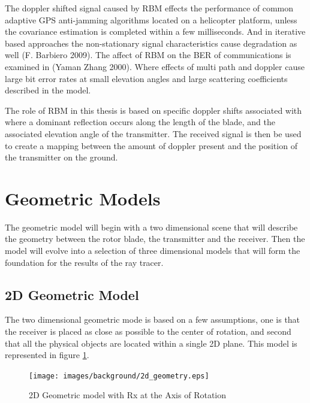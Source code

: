 The doppler shifted signal caused by RBM effects the performance of common adaptive GPS anti-jamming algorithms located on a helicopter platform, unless the covariance estimation is completed within a few milliseconds. And in iterative based approaches the non-stationary signal characteristics cause degradation as well (F. Barbiero 2009). The affect of RBM on the BER of communications is examined in (Yaman Zhang 2000). Where effects of multi path and doppler cause large bit error rates at small elevation angles and large scattering coefficients described in the model.

The role of RBM in this thesis is based on specific doppler shifts associated with where a dominant reflection occurs along the length of the blade, and the associated elevation angle of the transmitter. The received signal is then be used to create a mapping between the amount of doppler present and the position of the transmitter on the ground.

\section{Geometric Models}
The geometric model will begin with a two dimensional scene that will describe the geometry between the rotor blade, the transmitter and the receiver. Then the model will evolve into a selection of three dimensional models that will form the foundation for the results of the ray tracer.

\subsection{2D Geometric Model}
The two dimensional geometric mode is based on a few assumptions, one is that the receiver is placed as close as possible to the center of rotation, and second that all the physical objects are located within a single 2D plane. This model is represented in figure \ref{fig:2D_model}.

\begin{figure}[h]
	\begin{center}
		\texttt{[image: images/background/2d\_geometry.eps]}
		\caption{2D Geometric model with Rx at the Axis of Rotation}
		\label{fig:2D_model}
	\end{center}
\end{figure}

